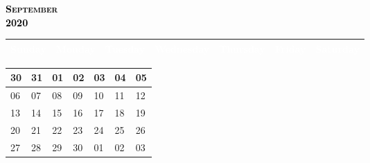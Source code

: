 \documentclass{article}
\newcommand{\daysize}{2.5cm}		%
\newcommand{\dw}{3.5cm}					%
\newcommand{\mkday}[1]{
  #1
  \vspace{\daysize}
}
\begin{document}
		\begin{center}
			\textsc{\LARGE \textbf{\textcolor{black}{
			September
			}}}\\ %
			\textsc{\large \textbf{\textcolor{black}{
			2020
			}}} %
		\end{center}

		\begin{center}
		\begin{tabular}{| p{\dw} | p{\dw} | p{\dw} | p{\dw} | p{\dw} | p{\dw} | p{\dw} |}
			\hline
			\cellcolor{bannercolor} \textcolor{white}{Sunday} &
			\cellcolor{bannercolor} \textcolor{white}{Monday} &
			\cellcolor{bannercolor} \textcolor{white}{Tuesday} &
			\cellcolor{bannercolor} \textcolor{white}{Wednesday} &
			\cellcolor{bannercolor} \textcolor{white}{Thursday} &
			\cellcolor{bannercolor} \textcolor{white}{Friday} &
			\cellcolor{bannercolor} \textcolor{white}{Saturday} \\
			\hline
		\end{tabular}

		\vspace{0.1cm}

		\begin{tabular}{| p{\dw} | p{\dw} | p{\dw} | p{\dw} | p{\dw} | p{\dw} | p{\dw} |}
\hline 
\cellcolor{weekendcolor}\mkday{
    30
} & 
\mkday{
    31
} &
\mkday{
    01
} &
\mkday{
    02
} &
\mkday{
    03
} &
\mkday{
    04
} &
\cellcolor{weekendcolor}\mkday{
    05
} 
\\
\hline 
\cellcolor{weekendcolor}\mkday{
    06
} & 
\mkday{
    07
} &
\mkday{
    08
} &
\mkday{
    09
} &
\mkday{
    10
} &
\mkday{
    11
} &
\cellcolor{weekendcolor}\mkday{
    12
} 
\\
\hline 
\cellcolor{weekendcolor}\mkday{
    13
} & 
\mkday{
    14
} &
\mkday{
    15
} &
\mkday{
    16
} &
\mkday{
    17
} &
\mkday{
    18
} &
\cellcolor{weekendcolor}\mkday{
    19
} 
\\
\hline 
\cellcolor{weekendcolor}\mkday{
    20
} & 
\mkday{
    21
} &
\mkday{
    22
} &
\mkday{
    23
} &
\mkday{
    24
} &
\mkday{
    25
} &
\cellcolor{weekendcolor}\mkday{
    26
} 
\\
\hline 
\cellcolor{weekendcolor}\mkday{
    27
} & 
\mkday{
    28
} &
\mkday{
    29
} &
\mkday{
    30
} &
\mkday{
    01
} &
\mkday{
    02
} &
\cellcolor{weekendcolor}\mkday{
    03
} 
\\
		\end{tabular}

		\end{center}
\end{document}

